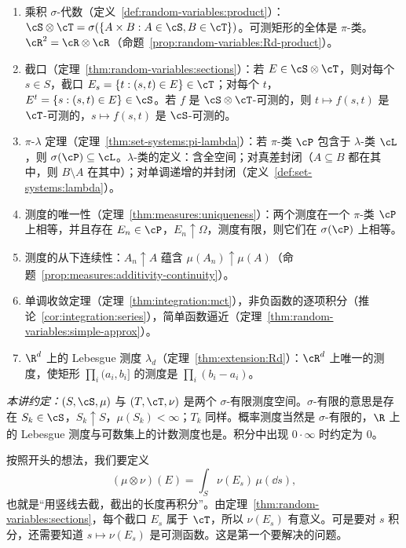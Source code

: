 \begin{enumerate}
\item 乘积 $\sigma$-代数（定义~\ref{def:random-variables:product}）：$\cS\otimes\cT=\sigma(\{A\times B:A\in\cS,B\in\cT\})$。可测矩形的全体是 $\pi$-类。$\cR^2=\cR\otimes\cR$（命题~\ref{prop:random-variables:Rd-product}）。
\item 截口（定理~\ref{thm:random-variables:sections}）：若 $E\in\cS\otimes\cT$，则对每个 $s\in S$，截口 $E_s=\{t:(s,t)\in E\}\in\cT$；对每个 $t$，$E^t=\{s:(s,t)\in E\}\in\cS$。若 $f$ 是 $\cS\otimes\cT$-可测的，则 $t\mapsto f(s,t)$ 是 $\cT$-可测的，$s\mapsto f(s,t)$ 是 $\cS$-可测的。
\item $\pi$-$\lambda$ 定理（定理~\ref{thm:set-systems:pi-lambda}）：若 $\pi$-类 $\cP$ 包含于 $\lambda$-类 $\cL$，则 $\sigma(\cP)\subseteq\cL$。$\lambda$-类的定义：含全空间；对真差封闭（$A\subseteq B$ 都在其中，则 $B\setminus A$ 在其中）；对单调递增的并封闭（定义~\ref{def:set-systems:lambda}）。
\item 测度的唯一性（定理~\ref{thm:measures:uniqueness}）：两个测度在一个 $\pi$-类 $\cP$ 上相等，并且存在 $E_n\in\cP$，$E_n\uparrow\Omega$，测度有限，则它们在 $\sigma(\cP)$ 上相等。
\item 测度的从下连续性：$A_n\uparrow A$ 蕴含 $\mu(A_n)\uparrow\mu(A)$（命题~\ref{prop:measures:additivity-continuity}）。
\item 单调收敛定理（定理~\ref{thm:integration:mct}），非负函数的逐项积分（推论~\ref{cor:integration:series}），简单函数逼近（定理~\ref{thm:random-variables:simple-approx}）。
\item $\R^d$ 上的 Lebesgue 测度 $\lambda_d$（定理~\ref{thm:extension:Rd}）：$\cR^d$ 上唯一的测度，使矩形 $\prod_i(a_i,b_i]$ 的测度是 $\prod_i(b_i-a_i)$。
\end{enumerate}

\emph{本讲约定：}$(S,\cS,\mu)$ 与 $(T,\cT,\nu)$ 是两个 $\sigma$-有限测度空间。$\sigma$-有限的意思是存在 $S_k\in\cS$，$S_k\uparrow S$，$\mu(S_k)<\infty$；$T_k$ 同样。概率测度当然是 $\sigma$-有限的，$\R$ 上的 Lebesgue 测度与可数集上的计数测度也是。积分中出现 $0\cdot\infty$ 时约定为 $0$。


按照开头的想法，我们要定义
\[
(\mu\otimes\nu)(E)=\int_S\nu(E_s)\,\mu(\dd s),
\]
也就是“用竖线去截，截出的长度再积分”。由定理~\ref{thm:random-variables:sections}，每个截口 $E_s$ 属于 $\cT$，所以 $\nu(E_s)$ 有意义。可是要对 $s$ 积分，还需要知道 $s\mapsto\nu(E_s)$ 是可测函数。这是第一个要解决的问题。

